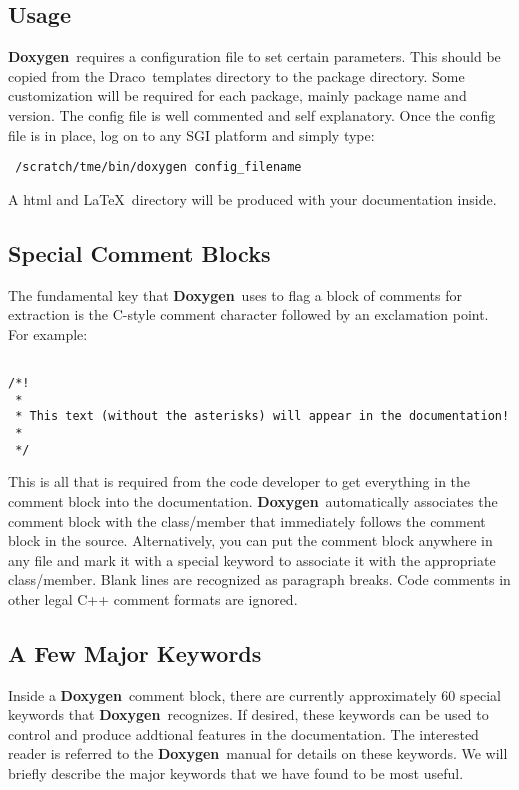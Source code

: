\documentclass[11pt]{nmemo}
\newcommand{\draco}{{\normalfont\sffamily Draco}}
\newcommand{\doxy}{{\normalfont\bfseries Doxygen}}
\begin{document}
\subsection{Usage}
\doxy\ requires a configuration file to set certain parameters. This should
be copied from the \draco\ templates directory to the package directory. 
Some customization will
be required for each package, mainly package name and version. The
config file is well commented and self explanatory. Once the config file
is in place, log on to any SGI platform and simply type:\begin{verbatim}
 /scratch/tme/bin/doxygen config_filename
\end{verbatim}
A html and \LaTeX\ directory will be produced with your documentation 
inside.

\subsection{Special Comment Blocks}

The fundamental key that \doxy\ uses to flag a block of comments for
extraction is the C-style comment character followed by an exclamation
point. For example:\begin{verbatim}

/*!
 *
 * This text (without the asterisks) will appear in the documentation!
 *
 */

\end{verbatim}

This is all that is required from the code developer to get everything
in the comment block into the documentation. \doxy\ automatically associates
the comment block with the class/member that immediately follows the 
comment block in the source. Alternatively, you can put the comment block
anywhere in any file and mark it with a special keyword to associate it
with the appropriate class/member. Blank lines are recognized as paragraph
breaks. Code comments in other legal C++ comment formats are ignored.

\subsection{A Few Major Keywords}

Inside a \doxy\ comment block, there are currently approximately 60 special
keywords that \doxy\ recognizes. If desired, these keywords can be used to 
control and produce addtional features in the documentation. 
 The interested reader is referred to the \doxy\
manual for details on these keywords. 
We will briefly describe the major keywords that we have
found to be most useful. 
\end{document}
